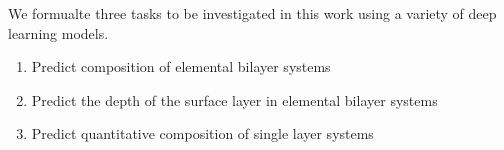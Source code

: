 We formualte three tasks to be investigated in this work using a variety of deep learning models.
\begin{enumerate}
    \item Predict composition of elemental bilayer systems
    \item Predict the depth of the surface layer in elemental bilayer systems 
    \item Predict quantitative composition of single layer systems
\end{enumerate}



